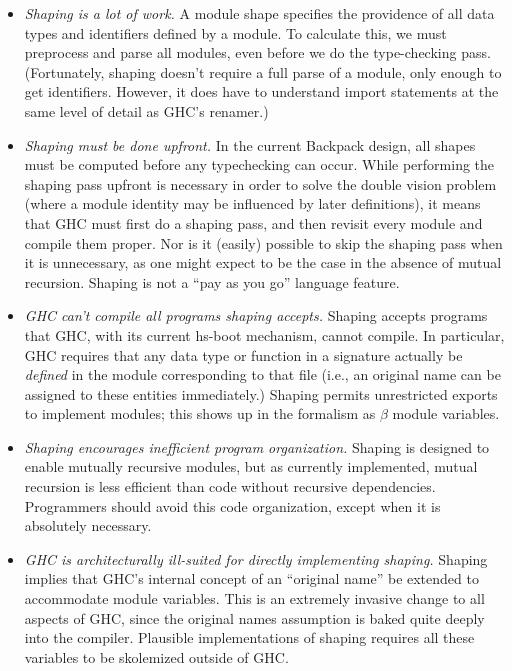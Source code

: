 \documentclass{article}
\begin{document}
\begin{itemize}

    \item \emph{Shaping is a lot of work.} A module shape specifies the
        providence of all data types and identifiers defined by a
        module. To calculate this, we must preprocess and parse all
        modules, even before we do the type-checking pass.  (Fortunately,
        shaping doesn't require a full parse of a module, only enough
        to get identifiers.  However, it does have to understand import
        statements at the same level of detail as GHC's renamer.)

    \item \emph{Shaping must be done upfront.} In the current Backpack
        design, all shapes must be computed before any typechecking can
        occur.  While performing the shaping pass upfront is necessary
        in order to solve the double vision problem (where a module
        identity may be influenced by later definitions), it means
        that GHC must first do a shaping pass, and then revisit every module and
        compile them proper.  Nor is it (easily) possible to skip the
        shaping pass when it is unnecessary, as one might expect to be
        the case in the absence of mutual recursion.  Shaping is not
        a ``pay as you go'' language feature.

    \item \emph{GHC can't compile all programs shaping accepts.}  Shaping
        accepts programs that GHC, with its current hs-boot mechanism, cannot
        compile.  In particular, GHC requires that any data type or function
        in a signature actually be \emph{defined} in the module corresponding
        to that file (i.e., an original name can be assigned to these entities
        immediately.)  Shaping permits unrestricted exports to implement
        modules; this shows up in the formalism as $\beta$ module variables.

    \item \emph{Shaping encourages inefficient program organization.}
        Shaping is designed to enable mutually recursive modules, but as
        currently implemented, mutual recursion is less efficient than
        code without recursive dependencies. Programmers should avoid
        this code organization, except when it is absolutely necessary.

    \item \emph{GHC is architecturally ill-suited for directly
        implementing shaping.}  Shaping implies that GHC's internal
        concept of an ``original name'' be extended to accommodate
        module variables.  This is an extremely invasive change to all
        aspects of GHC, since the original names assumption is baked
        quite deeply into the compiler.  Plausible implementations of
        shaping requires all these variables to be skolemized outside
        of GHC\@.

\end{itemize}
\end{document}
